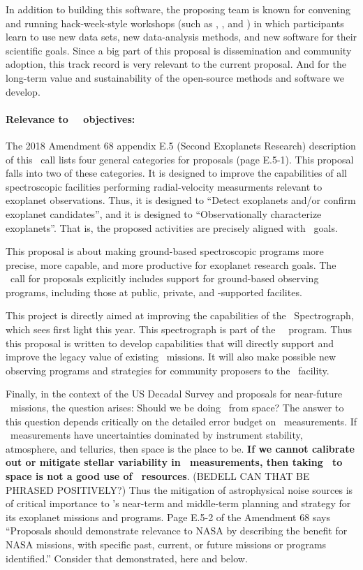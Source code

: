 \documentclass[12pt, letterpaper]{article}
\begin{document}
In addition to building this software, the proposing team is known for
convening and running hack-week-style workshops (such as , , and ) in which participants learn to use new data sets, new
data-analysis methods, and new software for their scientific goals.
Since a big part of this proposal is dissemination and community adoption,
this track record is very relevant to the current proposal.
And for the long-term value and sustainability of the open-source methods
and software we develop.

\paragraph{Relevance to \NASA\ \XRP\ objectives:} The 2018 
Amendment 68 appendix E.5 (Second Exoplanets Research) description of this
\XRP\ call lists four general categories for proposals (page
E.5-1).
This proposal falls into two of these categories.
It is designed to improve the capabilities of all spectroscopic
facilities performing radial-velocity measurments relevant to
exoplanet observations.
Thus, it is designed to ``Detect exoplanets and/or confirm exoplanet
candidates'', and it is designed to ``Observationally characterize
exoplanets''.
That is, the proposed activities are precisely aligned with
\XRP\ goals.

This proposal is about making ground-based spectroscopic programs more
precise, more capable, and more productive for exoplanet research
goals.
The \XRP\ call for proposals explicitly includes support for
ground-based observing programs, including those at public, private,
and \NASA-supported facilites.

This project is directly aimed at improving the capabilities of the
\NEID\ Spectrograph, which sees first light this year.
This spectrograph is part of the \NASA\ \NNEXPLORE\ program.
Thus this proposal is written to develop capabilities that will
directly support and improve the legacy value of existing
\NASA\ missions.
It will also make possible new observing programs and strategies for
community proposers to the \NNEXPLORE\ facility.

Finally, in the context of the US Decadal Survey and proposals for near-future
\NASA\ missions, the question arises: Should we be doing \EPRV\ from space?
The answer to this question depends critically on the detailed error budget on
\EPRV\ measurements.
If \EPRV\ measurements have uncertainties dominated by instrument
stability, atmosphere, and tellurics, then space is the place to be.
\textbf{If we cannot calibrate out or mitigate stellar variability
  in \EPRV\ measurements, then taking
  \EPRV\ to space is not a good use of \NASA\ resources}.
(BEDELL CAN THAT BE PHRASED POSITIVELY?)
Thus the mitigation of astrophysical noise sources is of critical
importance to \NASA's near-term and middle-term planning and strategy
for its exoplanet missions and programs.
Page E.5-2 of the  Amendment 68 says ``Proposals
should demonstrate relevance to NASA by describing the benefit for
NASA missions, with specific past, current, or future missions or
programs identified.''  Consider that demonstrated, here and below.
\end{document}
